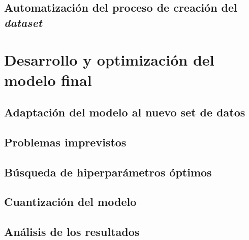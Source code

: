 \subsection{Automatización del proceso de creación del \textit{dataset}}



\section{Desarrollo y optimización del modelo final}

\subsection{Adaptación del modelo al nuevo set de datos}

\subsection{Problemas imprevistos}

\subsection{Búsqueda de hiperparámetros óptimos}

\subsection{Cuantización del modelo}

\subsection{Análisis de los resultados}


